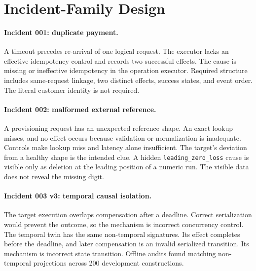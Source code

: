\section{Incident-Family Design}
\label{sec:families}
\paragraph{Incident 001: duplicate payment.}
A timeout precedes re-arrival of one logical request. The executor lacks an
effective idempotency control and records two successful effects. The cause is
missing or ineffective idempotency in the operation executor. Required
structure includes same-request linkage, two distinct effects, success states,
and event order. The literal customer identity is not required.

\paragraph{Incident 002: malformed external reference.}
A provisioning request has an unexpected reference shape. An exact lookup
misses, and no effect occurs because validation or normalization is
inadequate. Controls make lookup miss and latency alone insufficient. The
target's deviation from a healthy shape is the intended clue. A hidden
\texttt{leading\_zero\_loss} cause is visible only as deletion at the leading
position of a numeric run. The visible data does not reveal the missing digit.

\paragraph{Incident 003 v3: temporal causal isolation.}
The target execution overlaps compensation after a deadline. Correct
serialization would prevent the outcome, so the mechanism is incorrect
concurrency control. The temporal twin has the same
non-temporal signatures. Its effect completes before the deadline, and later
compensation is an invalid serialized transition. Its mechanism is
incorrect state transition. Offline audits found matching
non-temporal projections across 200 development constructions.

